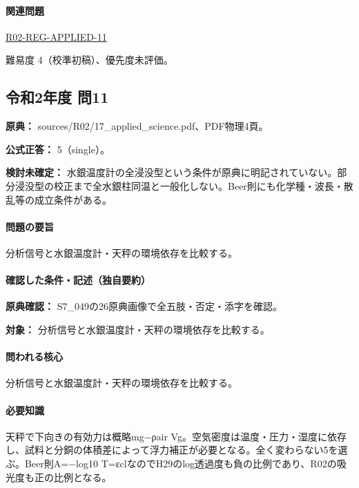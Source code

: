 \paragraph{関連問題} \hyperref[q:r02-reg-applied-11]{R02-REG-APPLIED-11}

\par 難易度 4（校準初稿）、優先度未評価。

\subsection{令和2年度 問11}
\label{q:r02-reg-applied-11}

\noindent\textbf{原典：} sources/R02/17\_applied\_science.pdf、PDF物理4頁。

\textbf{公式正答：} 5（single）。

\par\textbf{検討未確定：} 水銀温度計の全浸没型という条件が原典に明記されていない。部分浸没型の校正まで全水銀柱同温と一般化しない。Beer則にも化学種・波長・散乱等の成立条件がある。

\paragraph{問題の要旨} 分析信号と水銀温度計・天秤の環境依存を比較する。

\paragraph{確認した条件・記述（独自要約）}\mbox{}\par

\noindent\textbf{原典確認：} S7\_049の26原典画像で全五肢・否定・添字を確認。\par

\noindent\textbf{対象：} 分析信号と水銀温度計・天秤の環境依存を比較する。\par

\paragraph{問われる核心} 分析信号と水銀温度計・天秤の環境依存を比較する。

\paragraph{必要知識} 天秤で下向きの有効力は概略mg−ρair Vg。空気密度は温度・圧力・湿度に依存し、試料と分銅の体積差によって浮力補正が必要となる。全く変わらない5を選ぶ。Beer則A=−log10 T=εclなのでH29のlog透過度も負の比例であり、R02の吸光度も正の比例となる。

